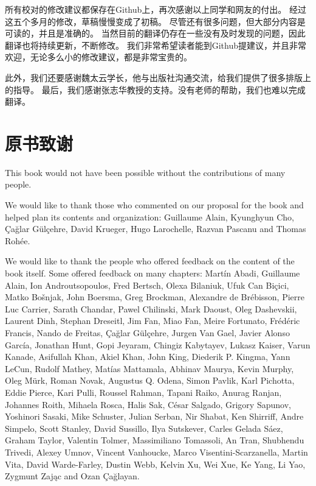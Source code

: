 所有校对的修改建议都保存在Github上，再次感谢以上同学和网友的付出。
经过这五个多月的修改，草稿慢慢变成了初稿。
尽管还有很多问题，但大部分内容是可读的，并且是准确的。
当然目前的翻译仍存在一些没有及时发现的问题，因此翻译也将持续更新，不断修改。
我们非常希望读者能到Github提建议，并且非常欢迎，无论多么小的修改建议，都是非常宝贵的。

此外，我们还要感谢魏太云学长，他与出版社沟通交流，给我们提供了很多排版上的指导。
最后，我们感谢张志华教授的支持。没有老师的帮助，我们也难以完成翻译。

\chapter*{原书致谢}
This book would not have been possible without the contributions of many people.

We would like to thank those who commented on our proposal for the book and helped plan its contents and organization:
Guillaume Alain, Kyunghyun Cho, \c{C}a\u{g}lar G\"ul\c{c}ehre, David Krueger, Hugo Larochelle, Razvan Pascanu and Thomas Roh\'ee.

We would like to thank the people who offered feedback on the content of the book itself. Some offered feedback on many chapters:
Mart\'in Abadi, Guillaume Alain, Ion Androutsopoulos, Fred Bertsch, Olexa Bilaniuk, Ufuk Can Biçici, Matko Bo\v{s}njak, John Boersma, Greg Brockman, Alexandre de Brébisson, Pierre Luc Carrier, Sarath Chandar, Pawel Chilinski, Mark Daoust, Oleg Dashevskii, Laurent Dinh, Stephan Dreseitl, Jim Fan, Miao Fan, Meire Fortunato, Fr\'ed\'eric Francis, Nando de Freitas, \c{C}a\u{g}lar G\"ul\c{c}ehre, Jurgen Van Gael, Javier Alonso Garc\'ia, Jonathan Hunt, Gopi Jeyaram, Chingiz Kabytayev, Lukasz Kaiser, Varun Kanade, Asifullah Khan, Akiel Khan, John King, Diederik P. Kingma, Yann LeCun, Rudolf Mathey, Matías Mattamala, Abhinav Maurya, Kevin Murphy, Oleg Mürk, Roman Novak, Augustus Q. Odena, Simon Pavlik, Karl Pichotta, Eddie Pierce, Kari Pulli, Roussel Rahman, Tapani Raiko, Anurag Ranjan, Johannes Roith, Mihaela Rosca, Halis Sak, César Salgado, Grigory Sapunov, Yoshinori Sasaki, Mike Schuster, Julian Serban, Nir Shabat, Ken Shirriff, Andre Simpelo, Scott Stanley, David Sussillo, Ilya Sutskever, Carles Gelada Sáez, Graham Taylor, Valentin Tolmer, Massimiliano Tomassoli, An Tran, Shubhendu Trivedi, Alexey Umnov, Vincent Vanhoucke, Marco Visentini-Scarzanella, Martin Vita, David Warde-Farley, Dustin Webb, Kelvin Xu, Wei Xue, Ke Yang, Li Yao, Zygmunt Zaj\k{a}c and Ozan \c{C}a\u{g}layan.


